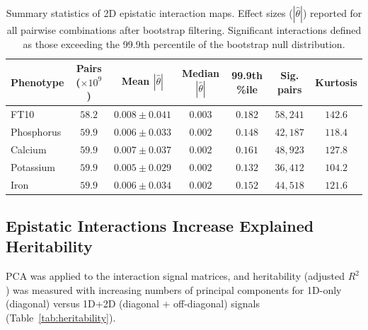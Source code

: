 \documentclass[11pt]{article}
\begin{document}
\begin{table}[H]
\centering
\caption{Summary statistics of 2D epistatic interaction maps. Effect sizes ($|\hat{\theta}|$) reported for all pairwise combinations after bootstrap filtering. Significant interactions defined as those exceeding the 99.9th percentile of the bootstrap null distribution.}
\label{tab:2d_stats}
\begin{tabular}{lcccccc}
\toprule
\textbf{Phenotype} & \textbf{Pairs ($\times 10^9$)} & \textbf{Mean $|\hat{\theta}|$} & \textbf{Median $|\hat{\theta}|$} & \textbf{99.9th \%ile} & \textbf{Sig. pairs} & \textbf{Kurtosis} \\
\midrule
FT10 & $58.2$ & $0.008 \pm 0.041$ & $0.003$ & $0.182$ & $58{,}241$ & $142.6$ \\
Phosphorus & $59.9$ & $0.006 \pm 0.033$ & $0.002$ & $0.148$ & $42{,}187$ & $118.4$ \\
Calcium & $59.9$ & $0.007 \pm 0.037$ & $0.002$ & $0.161$ & $48{,}923$ & $127.8$ \\
Potassium & $59.9$ & $0.005 \pm 0.029$ & $0.002$ & $0.132$ & $36{,}412$ & $104.2$ \\
Iron & $59.9$ & $0.006 \pm 0.034$ & $0.002$ & $0.152$ & $44{,}518$ & $121.6$ \\
\bottomrule
\end{tabular}
\end{table}

\subsection{Epistatic Interactions Increase Explained Heritability}

PCA was applied to the interaction signal matrices, and heritability (adjusted $R^2$) was measured with increasing numbers of principal components for 1D-only (diagonal) versus 1D+2D (diagonal + off-diagonal) signals (Table~\ref{tab:heritability}).
\end{document}
